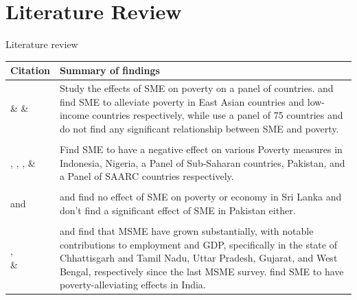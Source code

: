 \documentclass[10pt,aspectratio=169]{beamer}
\begin{document}
\section{Literature Review}
\begin{frame}{Literature review}
    \fontsize{8pt}{10pt}\selectfont
        \renewcommand{\arraystretch}{1.2}
\begin{tabularx}{\textwidth}{lX}
    \toprule
    \textbf{Citation} & \textbf{Summary of findings} \\
    \midrule

    \parbox[t]{0.3\linewidth}{\textcite{harvie2003contribution} \& \textcite{Beck2003SMEGrowth} \& \textcite{MAKSIMOV2017244}} 
    & Study the effects of SME on poverty on a panel of countries. \textcite{harvie2003contribution} and \textcite{MAKSIMOV2017244} find SME to alleviate poverty in East Asian countries and low-income countries respectively, while \textcite{Beck2003SMEGrowth} use a panel of 75 countries and do not find any significant relationship between SME and poverty. \\
        & \\
    \parbox[t]{0.3\linewidth}{\textcite{nursini2020msmes}, \textcite{asikhia2016smes}, \textcite{abisuga2020smes}, \textcite{ali2014role} \& \textcite{manzoor2019role}} 
    & Find SME to have a negative effect on various Poverty measures in Indonesia, Nigeria, a Panel of Sub-Saharan countries, Pakistan, and a Panel of SAARC countries respectively. \\ 
        &  \\
    \parbox[t]{0.3\linewidth}{\textcite{vijayakumar2013empirical} and \textcite{manzoor2019role}} 
    & \textcite{vijayakumar2013empirical} and \textcite{manzoor2019role} find no effect of SME on poverty or economy in Sri Lanka and \textcite{manzoor2019role} don't find a significant effect of SME in Pakistan either. \\
     & \\
    \parbox[t]{0.3\linewidth}{\textcite{sinha2017study}, \textcite{manna2017status} \\ \& \textcite{manzoor2019role}} 
    & \textcite{sinha2017study} and \textcite{manna2017status} find that MSME  have grown substantially, with notable contributions to employment and GDP, specifically in the state of Chhattisgarh and Tamil Nadu, Uttar Pradesh, Gujarat, and West Bengal, respectively since the last MSME survey. \textcite{manzoor2019role} find SME to have poverty-alleviating effects in India.\\
    \bottomrule
\end{tabularx}
\end{frame}
\end{document}
